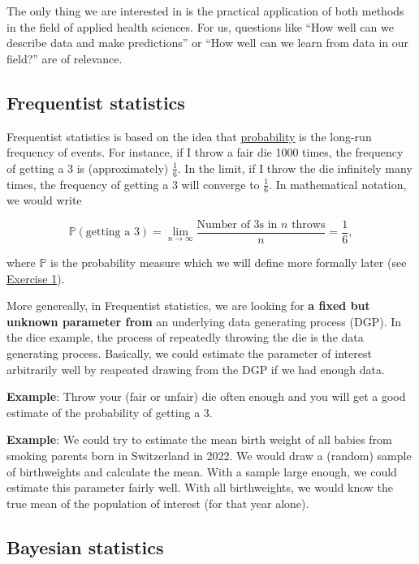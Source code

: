 \documentclass[
]{book}
\begin{document}
The only thing we are interested in is the practical application of both methods in the field of applied health sciences.
For us, questions like ``How well can we describe data and make predictions'' or
``How well can we learn from data in our field?'' are of relevance.

\subsection{Frequentist statistics}\label{frequentist-statistics}

Frequentist statistics is based on the idea that \href{https://en.wikipedia.org/wiki/Frequentist_probability}{probability} is the long-run
frequency of events. For instance, if I throw a fair die 1000 times, the frequency of getting a 3 is (approximately) \(\frac{1}{6}\). In the limit,
if I throw the die infinitely many times, the frequency of getting a 3 will converge to \(\frac{1}{6}\). In mathematical notation, we would write

\[
\mathbb{P}(\text{getting a 3}) = \lim_{n \to \infty} \frac{\text{Number of 3s in } n \text{ throws}}{n} = \frac{1}{6},
\]

where \(\mathbb{P}\) is the probability measure which we will define more formally later (see \hyperref[exercise1]{Exercise 1}).

More genereally, in Frequentist statistics, we are looking for \textbf{a fixed but unknown parameter from} an underlying data generating process (DGP).
In the dice example, the process of repeatedly throwing the die is the data generating process.
Basically, we could estimate the parameter of interest arbitrarily well by reapeated drawing from the DGP if we had enough data.

\textbf{Example}: Throw your (fair or unfair) die often enough and you will get a good estimate of the probability of getting a 3.

\textbf{Example}: We could try to estimate the mean birth weight of all babies from smoking parents born in Switzerland in 2022.
We would draw a (random) sample of birthweights and calculate the mean. With a sample large enough, we could estimate this parameter fairly well.
With all birthweights, we would know the true mean of the population of interest (for that year alone).

\subsection{Bayesian statistics}\label{bayesian-statistics}
\end{document}
